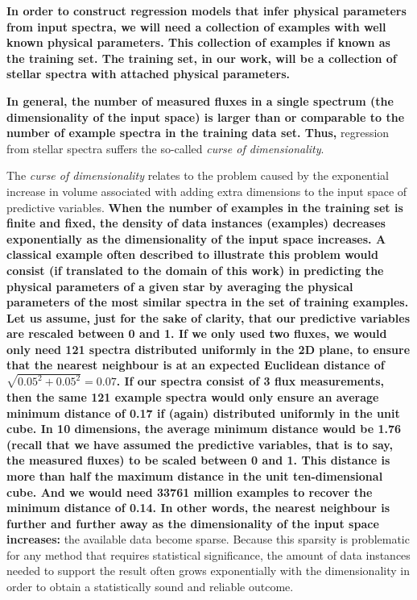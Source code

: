 \documentclass[a4paper,fleqn,usenatbib]{mnras}
\begin{document}
{\bf In order to construct regression models that infer physical parameters 
	from input spectra, we will need a collection of examples with well 
	known physical parameters. This collection of examples if known as 
	the training set. The training set, in our work, will be a collection 
	of stellar spectra with attached physical parameters.}

{\bf In general, the number of measured fluxes in a single 
spectrum (the dimensionality of the input space) is larger than or comparable to the number of 
example spectra in the training data set. Thus,} regression from 
stellar spectra suffers the so-called {\sl curse of dimensionality}. 
    
The \textit{curse of dimensionality} \citep{bellman:61} relates to 
the problem caused by the exponential increase in volume associated 
with adding extra dimensions to the input space of predictive variables. 
{\bf When the number of examples in the training set is finite and fixed, 
the density of data instances (examples) decreases exponentially as the 
dimensionality of the input space increases. 
A classical example often described to illustrate this problem would 
consist (if translated to the domain of this work) in predicting the physical 
parameters of a given star by averaging the physical parameters of the most 
similar spectra in the set of training examples. Let us assume, just for the 
sake of clarity, that our predictive variables are rescaled between 0 and 1. 
If we only used two fluxes, we would only need 121 spectra distributed 
uniformly in the 2D plane, to ensure that the nearest neighbour is at an 
expected Euclidean distance of $\sqrt{0.05^2+0.05^2}=0.07$. If our spectra consist 
of 3 flux measurements, then the same 121 example spectra would only 
ensure an average minimum distance of 0.17 if (again) distributed uniformly 
in the unit cube. In 10 dimensions,  the average minimum distance would be 
1.76 (recall that we have assumed the predictive variables, that is to say, the measured 
fluxes) to be scaled between 0 and 1. This distance is more than half the maximum 
distance in the unit ten-dimensional cube. And we would need 33761 million examples to 
recover the minimum distance of 0.14. In other words, the nearest neighbour 
is further and further away as the dimensionality of the input space increases:}
the available data become sparse. Because this sparsity is 
problematic for any method that requires statistical significance, the 
amount of data instances needed to support the result often grows 
exponentially with the dimensionality in order to obtain a statistically 
sound and reliable outcome.
\end{document}
